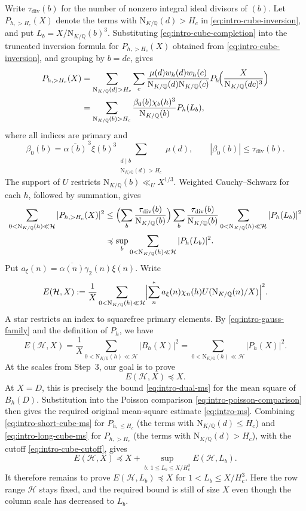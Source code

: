 \documentclass[11pt,a4paper]{article}
\numberwithin{equation}{section}
\numberwithin{figure}{section}
\theoremstyle{definition}
\theoremstyle{remark}
\newcommand{\Q}{\mathbb Q}
\newcommand{\NK}{\mathrm N_{K/\Q}}
\newcommand{\precbd}{\preccurlyeq}
\begin{document}
Write $\tau_{\mathrm{div}}(b)$ for the number of nonzero integral ideal divisors of $(b)$.
Let $P_{h,>H_c}(X)$ denote the terms with $\NK(d)>H_c$ in
\eqref{eq:intro-cube-inversion}, and put $L_b=X/\NK(b)^3$.
Substituting \eqref{eq:intro-cube-completion} into the truncated inversion formula for $P_{h,>H_c}(X)$ obtained from \eqref{eq:intro-cube-inversion}, and grouping by $b=dc$, gives
\[
 \begin{aligned}
 P_{h,>H_c}(X)
 &=\sum_{\NK(d)>H_c}\sum_c
   \frac{\mu(d)w_h(d)w_h(c)}{\NK(d)\NK(c)}
   P_h\!\Bigl(\frac{X}{\NK(dc)^3}\Bigr)\\
 &=\sum_{\NK(b)>H_c}
   \frac{\beta_0(b)\chi_b(h)^3}{\NK(b)}P_h(L_b),
 \end{aligned}
\]
where all indices are primary and
\[
 \beta_0(b)=\overline{\alpha(b)}^{\,3}\xi(b)^3
       \sum_{\substack{d\mid b\\\NK(d)>H_c}}\mu(d),
 \qquad |\beta_0(b)|\le\tau_{\mathrm{div}}(b).
\]
The support of $U$ restricts $\NK(b)\ll_U X^{1/3}$.
Weighted Cauchy--Schwarz for each $h$, followed by summation, gives
\begin{equation}\label{eq:intro-long-cube-ms}
 \begin{aligned}
 \sum_{0<\NK(h)\ll\mathcal H}|P_{h,>H_c}(X)|^2
 &\le\Bigl(\sum_b\frac{\tau_{\mathrm{div}}(b)}{\NK(b)}\Bigr)
 \sum_b\frac{\tau_{\mathrm{div}}(b)}{\NK(b)}
 \sum_{0<\NK(h)\ll\mathcal H}|P_h(L_b)|^2\\
 &\precbd\sup_b\sum_{0<\NK(h)\ll\mathcal H}|P_h(L_b)|^2.
 \end{aligned}
\end{equation}
Put
$a_\xi(n)=\overline{\alpha(n)}\gamma_2(n)\xi(n)$. Write
\[
 E(\mathcal H,X)
 :=\frac1X\sum_{0<\NK(h)\ll\mathcal H}
 \Bigl|\sum_n^*a_\xi(n)\chi_n(h)U(\NK(n)/X)\Bigr|^2.
\]
A star restricts an index to squarefree primary elements.
By \eqref{eq:intro-gauss-family} and the definition of $P_h$, we have
\[
 E(\mathcal H,X)
 =\frac1X\sum_{0<\NK(h)\ll\mathcal H}|B_h(X)|^2
 =\sum_{0<\NK(h)\ll\mathcal H}|P_h(X)|^2.
\]
At the scales from Step~3, our goal is to prove
\begin{equation}\label{eq:intro-energy-target}
 E(\mathcal H,X)\precbd X.
\end{equation}
At $X=D$, this is precisely the bound \eqref{eq:intro-dual-ms}
for the mean square of $B_h(D)$. Substitution into the Poisson
comparison \eqref{eq:intro-poisson-comparison} then gives the
required original mean-square estimate \eqref{eq:intro-ms}.
Combining \eqref{eq:intro-short-cube-ms} for $P_{h,\le H_c}$
(the terms with $\NK(d)\le H_c$) and \eqref{eq:intro-long-cube-ms}
for $P_{h,>H_c}$ (the terms with $\NK(d)>H_c$), with the cutoff
\eqref{eq:intro-cube-cutoff}, gives
 \[
 E(\mathcal H,X)\precbd X + \sup_{b:\,1\le L_b\le X/H_c^3}E(\mathcal H,L_b).
 \]
It therefore remains to prove $E(\mathcal H,L_b)\precbd X$ for
$1<L_b\le X/H_c^3$. Here the row range $\mathcal H$ stays fixed,
and the required bound is still of size $X$ even though the column
scale has decreased to $L_b$.
 
\end{document}
